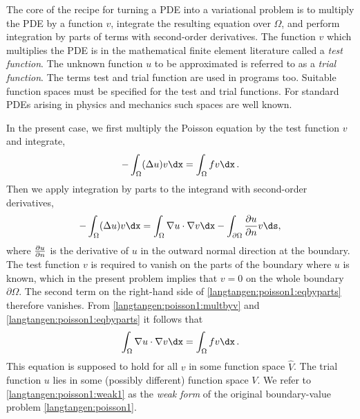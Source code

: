 
The core of the recipe for turning a PDE into a variational problem
is to multiply the PDE by a function $v$, integrate the resulting
equation over $\Omega$, and perform integration by parts of terms with
second-order derivatives. The function $v$ which multiplies the PDE
is in the mathematical finite element literature 
called a \emph{test function}. The unknown function $u$ to be approximated
is referred to
as a \emph{trial function}. The terms test and trial function are used
in \fenics{} programs too.
Suitable
function spaces must be specified for the test and trial functions.
For standard PDEs arising in physics and mechanics such spaces are
well known.

In the present case, we first multiply the Poisson equation
by the test function $v$ and integrate,
\begin{equation}
\label{langtangen:poisson1:multbyv}
 -\int_\Omega (\Delta u)v \dx = \int_\Omega fv\dx\langtangenep\end{equation}
Then we apply integration by parts to the integrand with
second-order derivatives,
\begin{equation}
\label{langtangen:poisson1:eqbyparts}
 -\int_\Omega (\Delta u)v \dx
= \int_\Omega\nabla u\cdot\nabla v\dx - \int_{\partial\Omega}{\partial u\over
\partial n}v\ds ,\end{equation}
where ${\partial u\over
\partial n}$ is the derivative of $u$ in the outward normal direction at
the boundary.
The test function $v$ is required to vanish on the parts of the
boundary where $u$ is known, which in the present problem implies that
$v=0$ on the whole boundary $\partial\Omega$.
The second term on
the right-hand side of \eqref{langtangen:poisson1:eqbyparts} therefore vanishes. 
From \eqref{langtangen:poisson1:multbyv} and \eqref{langtangen:poisson1:eqbyparts}
it follows that
\begin{equation} \int_\Omega\nabla u\cdot\nabla v\dx = \int_\Omega fv\dx\langtangenep
\label{langtangen:poisson1:weak1}
\end{equation}
This equation is supposed to hold
for all $v$ in some function space $\hat V$. The trial function $u$
lies in some (possibly different) function space $V$.
We refer to \eqref{langtangen:poisson1:weak1} as the \emph{weak form} of
the original boundary-value problem \eqref{langtangen:poisson1}.


